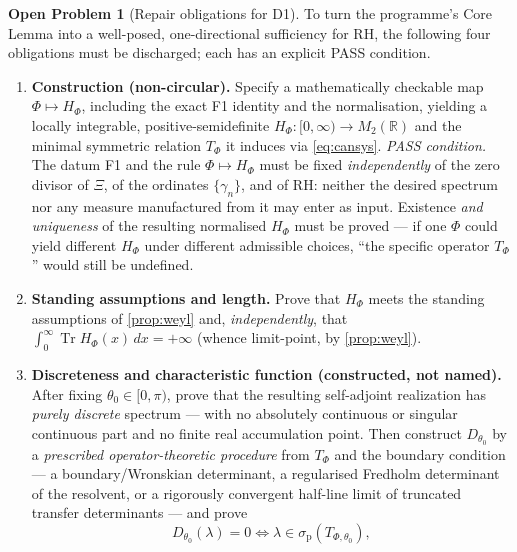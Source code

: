 \documentclass[12pt,a4paper]{amsart}
\theoremstyle{plain}
\theoremstyle{definition}
\newtheorem{problem}[theorem]{Open Problem}
\newcommand{\R}{\mathbb{R}}
\newcommand{\Tr}{\operatorname{Tr}}
\newcommand{\Ham}{H}
\begin{document}
\begin{problem}[Repair obligations for D1]\label{prob:gen}
  To turn the programme's Core Lemma into a well-posed, one-directional
  sufficiency for RH, the following four obligations must be discharged;
  each has an explicit PASS condition.
  \begin{enumerate}[label=(\arabic*)]
    \item \textbf{Construction (non-circular).}  Specify a mathematically
          checkable map $\Phi\mapsto\Ham_\Phi$, including the exact F1
          identity and the normalisation, yielding a locally integrable,
          positive-semidefinite
          $\Ham_\Phi\colon[0,\infty)\to M_2(\R)$ and the minimal symmetric
          relation $T_\Phi$ it induces via \cref{eq:cansys}.  \emph{PASS
          condition.}  The
          datum F1 and the rule $\Phi\mapsto\Ham_\Phi$ must be fixed
          \emph{independently} of the zero divisor of $\Xi$, of the
          ordinates $\{\gamma_n\}$, and of RH: neither the desired
          spectrum nor any measure manufactured from it may enter as
          input.  Existence \emph{and uniqueness} of the resulting
          normalised $\Ham_\Phi$ must be proved --- if one $\Phi$ could
          yield different $\Ham_\Phi$ under different admissible choices,
          ``the specific operator $T_\Phi$'' would still be undefined.
    \item \textbf{Standing assumptions and length.}  Prove that
          $\Ham_\Phi$ meets the standing assumptions of \cref{prop:weyl}
          and, \emph{independently}, that
          $\int_0^\infty\Tr\Ham_\Phi(x)\,dx=+\infty$ (whence limit-point,
          by \cref{prop:weyl}).
    \item \textbf{Discreteness and characteristic function
          (constructed, not named).}  After fixing $\theta_0\in[0,\pi)$,
          prove that the resulting self-adjoint realization has
          \emph{purely discrete} spectrum --- with no absolutely
          continuous or singular continuous part and no finite real
          accumulation point.  Then construct $D_{\theta_0}$ by a
          \emph{prescribed operator-theoretic procedure} from $T_\Phi$ and
          the boundary condition --- a boundary/Wronskian determinant, a
          regularised Fredholm determinant of the resolvent, or a
          rigorously convergent half-line limit of truncated transfer
          determinants --- and prove
          \begin{equation}\label{eq:charzero}
            D_{\theta_0}(\lambda)=0
            \iff \lambda\in\sigma_{\mathrm p}(T_{\Phi,\theta_0}),

\end{equation}
\end{enumerate}
\end{problem}
\end{document}
